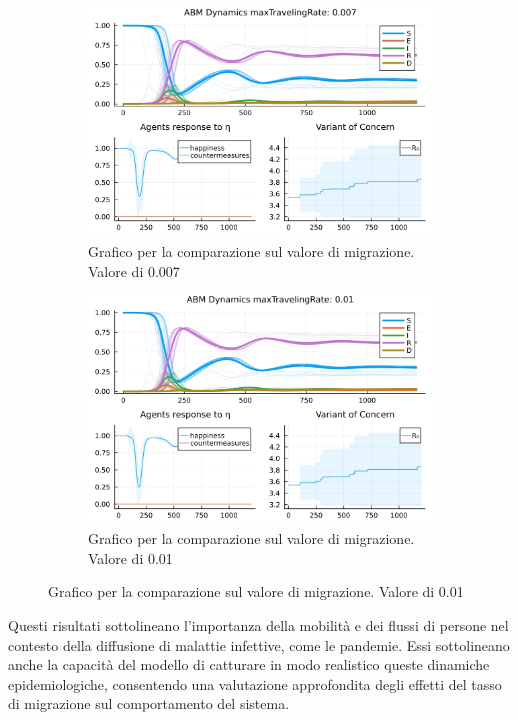 \begin{figure}[!hb]
\begin{subfigure}[b]{0.45\textwidth}
		\includegraphics[width=\textwidth]{img/SocialNetworkABM_3_MTR.jpg}
		\caption{Grafico per la comparazione sul valore di migrazione. Valore di 0.007}
		\label{fig:comparison_maxTravelingRate_midh}
	\end{subfigure}
	\hfill
	\begin{subfigure}[b]{0.45\textwidth}
		\centering
		\includegraphics[width=\textwidth]{img/SocialNetworkABM_4_MTR.jpg}
		\caption{Grafico per la comparazione sul valore di migrazione. Valore di 0.01}
		\label{fig:comparison_maxTravelingRate_high}
	\end{subfigure}
\end{figure}

Questi risultati sottolineano l'importanza della mobilità e dei flussi 
di persone nel contesto della diffusione di malattie infettive, come le 
pandemie. Essi sottolineano anche la capacità del modello di catturare 
in modo realistico queste dinamiche epidemiologiche, consentendo una 
valutazione approfondita degli effetti del tasso di migrazione sul 
comportamento del sistema.
\newpage

